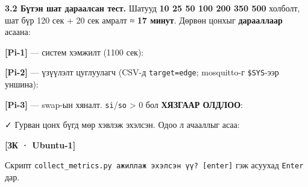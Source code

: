 \textbf{3.2 Бүтэн шат дараалсан тест.} Шатууд \textbf{10 25 50 100 200 350 500} холболт, шат бүр 120 сек + 20 сек амралт ≈ \textbf{17 минут}. Дөрвөн цонхыг \textbf{дарааллаар} асаана:

\textbf{{[}Pi-1{]}} --- систем хэмжилт (1100 сек):

\begin{Shaded}
\begin{Highlighting}[]
\KeywordTok{|} 
\end{Highlighting}
\end{Shaded}

\textbf{{[}Pi-2{]}} --- үзүүлэлт цуглуулагч (CSV-д \texttt{target=edge}; mosquitto-г \texttt{\$SYS}-ээр уншина):

\begin{Shaded}
\begin{Highlighting}[]
 
\end{Highlighting}
\end{Shaded}

\textbf{{[}Pi-3{]}} --- swap-ын хяналт. \texttt{si}/\allowbreak\texttt{so} \textgreater{} 0 бол \textbf{ХЯЗГААР ОЛДЛОО}:

\begin{Shaded}
\begin{Highlighting}[]
\KeywordTok{|} 
\end{Highlighting}
\end{Shaded}

✓ Гурван цонх бүгд мөр хэвлэж эхэлсэн. Одоо л ачааллыг асаа:

\textbf{{[}ЗК · Ubuntu-1{]}}

\begin{Shaded}
\begin{Highlighting}[]
\OperatorTok{\textless{}}\OperatorTok{\textgreater{}}
\end{Highlighting}
\end{Shaded}

Скрипт \texttt{collect\_\allowbreak{}metrics.\allowbreak{}py\ ажиллаж\ эхэлсэн\ үү?\allowbreak{}\ {[}enter{]}} гэж асуухад \texttt{Enter} дар.

